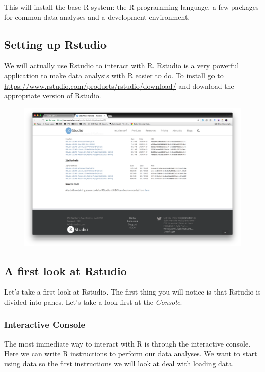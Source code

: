 \documentclass[]{article}
\theoremstyle{definition}
\theoremstyle{definition}
\theoremstyle{remark}
\begin{document}
This will install the base R system: the R programming language, a few
packages for common data analyses and a development environment.

\subsection{Setting up Rstudio}\label{setting-up-rstudio}

We will actually use Rstudio to interact with R. Rstudio is a very
powerful application to make data analysis with R easier to do. To
install go to \url{https://www.rstudio.com/products/rstudio/download/}
and download the appropriate version of Rstudio.

\begin{figure}[htbp]
\centering
\includegraphics{img/rstudio.png}
\caption{}
\end{figure}

\subsection{A first look at Rstudio}\label{a-first-look-at-rstudio}

Let's take a first look at Rstudio. The first thing you will notice is
that Rstudio is divided into panes. Let's take a look first at the
\emph{Console}.

\subsubsection{Interactive Console}\label{interactive-console}

The most immediate way to interact with R is through the interactive
console. Here we can write R instructions to perform our data analyses.
We want to start using data so the first instructions we will look at
deal with loading data.
\end{document}
